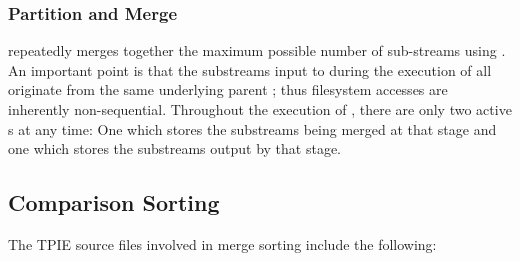 \subsubsection{Partition and Merge}

\tobeextended

 repeatedly merges together the maximum
possible number of sub-streams using . An important point
is that the substreams input to  during the execution of
 all originate from the same underlying
parent ; thus filesystem accesses are inherently
non-sequential. Throughout the execution of
, there are only two active
s at any time: One which stores the substreams being
merged at that stage and one which stores the substreams output by that
stage.


\subsection{Comparison Sorting}


The TPIE source files involved in merge sorting include the following:

